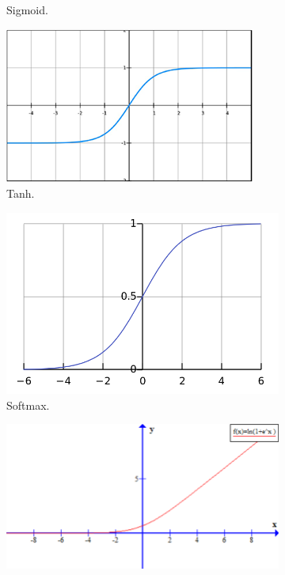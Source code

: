 \documentclass[]{UCD_CS_FYP_Report}
\begin{document}
\begin{figure}[h!]
\begin{subfigure}[b]{0.3\linewidth}
    \caption{\label{fig:Sigmoid}Sigmoid.}
  \end{subfigure}
  \begin{subfigure}[b]{0.3\linewidth}
    \includegraphics[width=\linewidth]{Images/Tanh.png}
    \caption{\label{fig:Tanh}Tanh.}
  \end{subfigure}
  \begin{subfigure}[b]{0.3\linewidth}
    \includegraphics[width=\linewidth]{Images/Softmax.png}
     \caption{\label{fig:Softmax}Softmax.}
  \end{subfigure}
  \begin{subfigure}[b]{0.3\linewidth}
    \includegraphics[width=\linewidth]{Images/Softplus.png}

\end{subfigure}
\end{figure}
\end{document}
